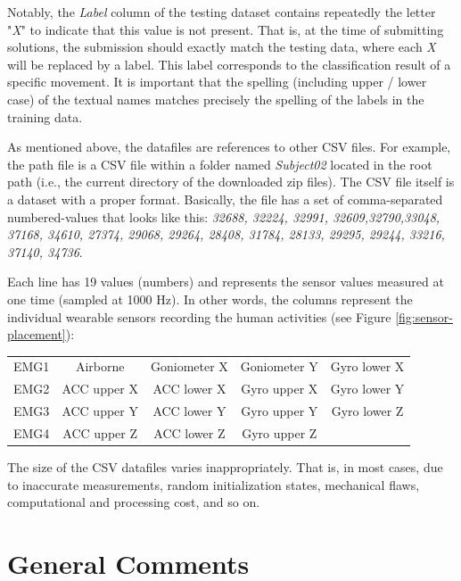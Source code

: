 Notably, the \emph{Label} column of the testing dataset contains repeatedly the letter "\textit{X}"
to indicate that this value is not present. That is, at the time of submitting solutions, the submission should
exactly match the testing data, where each \emph{X} will be replaced by a label. This label corresponds to the
classification result of a specific movement. It is important that the spelling (including upper / lower
case) of the textual names matches precisely the spelling of the labels in the training data.

As mentioned above, the datafiles are references to other CSV files. For example, the path file
 is a CSV file within a folder named \emph{Subject02}
located in the root path (i.e., the current directory of the downloaded zip files). The CSV file itself
is a dataset with a proper format. Basically, the file has a set of comma-separated numbered-values
that looks like this: \textit{32688, 32224, 32991, 32609,32790,33048, 37168, 34610, 27374, 29068, 29264,
28408, 31784, 28133, 29295, 29244, 33216, 37140, 34736}.

Each line has 19 values (numbers) and represents the sensor values measured at one time (sampled at
1000 Hz). In other words, the columns represent the individual wearable sensors recording the human
activities (see Figure \ref{fig:sensor-placement}):

\begin{center}
    \begin{tabular}{ c c c c c }
     EMG1 & Airborne    & Goniometer X & Goniometer Y & Gyro lower X \\
     EMG2 & ACC upper X & ACC lower X  & Gyro upper X & Gyro lower Y \\
     EMG3 & ACC upper Y & ACC lower Y  & Gyro upper Y & Gyro lower Z \\
     EMG4 & ACC upper Z & ACC lower Z  & Gyro upper Z &
    \end{tabular}
\end{center}


The size of the CSV datafiles varies inappropriately. That is, in most cases, due to inaccurate measurements,
random initialization states, mechanical flaws, computational and processing cost, and so on.


\section{General Comments}

